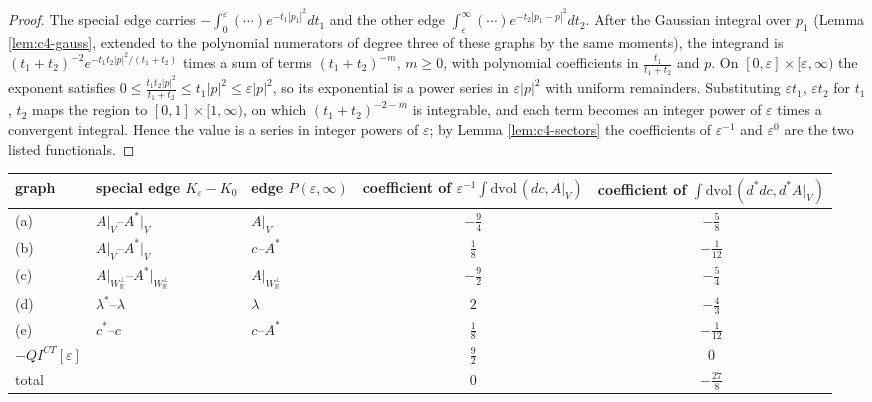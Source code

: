 \begin{proof}
The special edge carries $-\int_0^\varepsilon(\cdots)e^{-t_1|p_1|^2}dt_1$ and the other edge $\int_\varepsilon^\infty(\cdots)e^{-t_2|p_1-p|^2}dt_2$. After the Gaussian integral over $p_1$ (Lemma \ref{lem:c4-gauss}, extended to the polynomial numerators of degree three of these graphs by the same moments), the integrand is $(t_1+t_2)^{-2}e^{-t_1t_2|p|^2/(t_1+t_2)}$ times a sum of terms $(t_1+t_2)^{-m}$, $m\ge0$, with polynomial coefficients in $\frac{t_1}{t_1+t_2}$ and $p$. On $[0,\varepsilon]\times[\varepsilon,\infty)$ the exponent satisfies $0\le\frac{t_1t_2|p|^2}{t_1+t_2}\le t_1|p|^2\le\varepsilon|p|^2$, so its exponential is a power series in $\varepsilon|p|^2$ with uniform remainders. Substituting $\varepsilon t_1$, $\varepsilon t_2$ for $t_1$, $t_2$ maps the region to $[0,1]\times[1,\infty)$, on which $(t_1+t_2)^{-2-m}$ is integrable, and each term becomes an integer power of $\varepsilon$ times a convergent integral. Hence the value is a series in integer powers of $\varepsilon$; by Lemma \ref{lem:c4-sectors} the coefficients of $\varepsilon^{-1}$ and $\varepsilon^0$ are the two listed functionals.
\end{proof}

\begin{tabular}{l|l|l|c|c}
graph & special edge $K_\varepsilon-K_0$ & edge $P(\varepsilon,\infty)$ & coefficient of $\varepsilon^{-1}\int\mathrm{dvol}\,(dc,A|_V)$ & coefficient of $\int\mathrm{dvol}\,(d^*dc,d^*A|_V)$ \\
\hline
(a) & $A|_V$--$A^*|_V$ & $A|_V$ & $-\tfrac94$ & $-\tfrac58$ \\
(b) & $A|_V$--$A^*|_V$ & $c$--$A^*$ & $\tfrac18$ & $-\tfrac1{12}$ \\
(c) & $A|_{W_{\mathbb R}^\perp}$--$A^*|_{W_{\mathbb R}^\perp}$ & $A|_{W_{\mathbb R}^\perp}$ & $-\tfrac92$ & $-\tfrac54$ \\
(d) & $\lambda^*$--$\lambda$ & $\lambda$ & $2$ & $-\tfrac43$ \\
(e) & $c^*$--$c$ & $c$--$A^*$ & $\tfrac18$ & $-\tfrac1{12}$ \\
$-QI^{CT}[\varepsilon]$ & & & $\tfrac92$ & $0$ \\
total & & & $0$ & $-\tfrac{27}{8}$ \\
\end{tabular}

